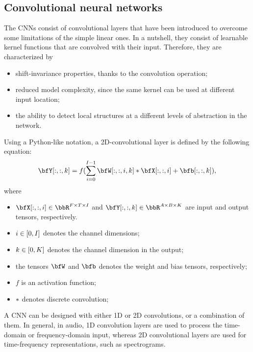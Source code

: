 \subsection{Convolutional neural networks}\label{subsec:lantern:cnn}
The \acp{CNN} consist of convolutional layers that have been introduced to overcome some limitations of the simple linear ones.
In a nutshell, they consist of learnable kernel functions that are convolved with their input.
Therefore, they are characterized by
\begin{itemize}
    \item shift-invariance properties, thanks to the convolution operation;
    \item reduced model complexity, since the same kernel can be used at different input location;
    \item the ability to detect local structures at a different levels of abstraction in the network.
\end{itemize}
Using a Python-like notation, a 2D-convolutional layer is defined by the following equation:
\begin{equation*}
    \bfY[:,:,k] = f( \sum_{i=0}^{I-1} \bfW[:,:,i,k] \convDis \bfX[:,:,i] + \bfb[:,:,k])
    ,
\end{equation*}
where
\begin{itemize}
    \item $\bfX[:,:,i]\in\bbR^{F \times T \times I}$ and $\bfY[:,:,k]\in\bbR^{A \times B \times K}$ are input and output tensors, respectively.
    \item $i\in\klist{0,I}$ denotes the channel dimensions;
    \item $k\in\klist{0,K}$ denotes the channel dimension in the output;
    \item the tensors $\bfW$ and $\bfb$ denotes the weight and bias tensors, respectively;
    \item $f$ is an activation function;
    \item $\ast$ denotes discrete convolution;
\end{itemize}
A \ac{CNN} can be designed with either 1D or 2D convolutions, or a combination of them.
In general, in audio, 1D convolution layers are used to process the time-domain or frequency-domain input, whereas 2D convolutional layers are used for time-frequency representations, such as spectrograms.
